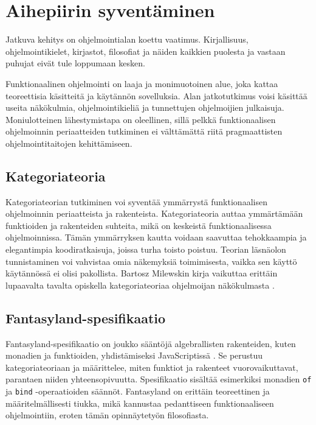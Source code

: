 \section{Aihepiirin syventäminen}

Jatkuva kehitys on ohjelmointialan koettu vaatimus. Kirjallisuus, ohjelmointikielet, kirjastot, filosofiat ja näiden kaikkien puolesta ja vastaan puhujat eivät tule loppumaan kesken.

Funktionaalinen ohjelmointi on laaja ja monimuotoinen alue, joka kattaa teoreettisia käsitteitä ja käytännön sovelluksia. Alan jatkotutkimus voisi käsittää useita näkökulmia, ohjelmointikieliä ja tunnettujen ohjelmoijien julkaisuja. Moniulotteinen lähestymistapa on oleellinen, sillä pelkkä funktionaalisen ohjelmoinnin periaatteiden tutkiminen ei välttämättä riitä pragmaattisten ohjelmointitaitojen kehittämiseen.

\subsection{Kategoriateoria}

Kategoriateorian tutkiminen voi syventää ymmärrystä funktionaalisen ohjelmoinnin periaatteista ja rakenteista. Kategoriateoria auttaa ymmärtämään funktioiden ja rakenteiden suhteita, mikä on keskeistä funktionaalisessa ohjelmoinnissa. Tämän ymmärryksen kautta voidaan saavuttaa tehokkaampia ja elegantimpia koodiratkaisuja, joissa turha toisto poistuu. Teorian läsnäolon tunnistaminen voi vahvistaa omia näkemyksiä toimimisesta, vaikka sen käyttö käytännössä ei olisi pakollista.
Bartosz Milewskin kirja  vaikuttaa erittäin lupaavalta tavalta opiskella kategoriateoriaa ohjelmoijan näkökulmasta \cite{milewski2017category}.

\subsection{Fantasyland-spesifikaatio}

Fantasyland-spesifikaatio on joukko sääntöjä algebrallisten rakenteiden, kuten monadien ja funktioiden, yhdistämiseksi JavaScriptissä \cite{fantasy-land:contributors}. Se perustuu kategoriateoriaan ja määrittelee, miten funktiot ja rakenteet vuorovaikuttavat, parantaen niiden yhteensopivuutta. Spesifikaatio sisältää esimerkiksi monadien \texttt{of} ja \texttt{bind} -operaatioiden säännöt. Fantasyland on erittäin teoreettinen ja määritelmällisesti tiukka, mikä kannustaa pedanttiseen funktionaaliseen ohjelmointiin, eroten tämän opinnäytetyön filosofiasta.

